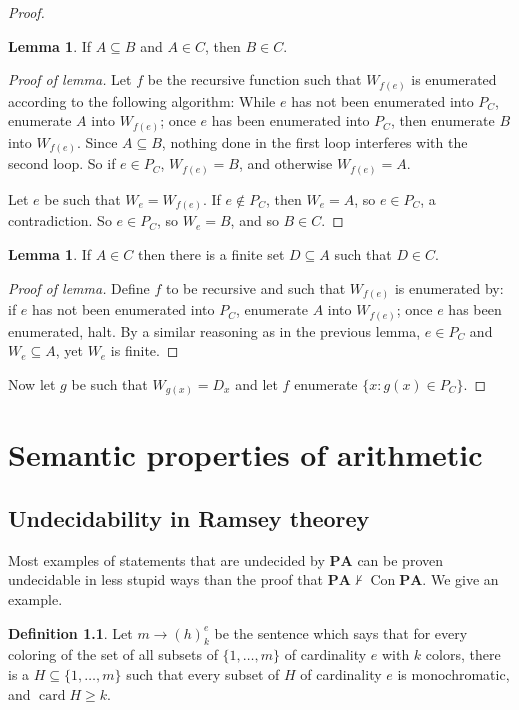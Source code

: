 \documentclass[12pt]{report}
\newcommand{\card}{\operatorname{card}}
\newcommand{\PA}{\mathbf{PA}}
\newcommand{\proves}{\vdash}
\DeclareMathOperator{\Con}{Con}
\theoremstyle{definition}
\newtheorem{lemma}[theorem]{Lemma}
\newtheorem{definition}[theorem]{Definition}
\begin{document}
\begin{proof}
\begin{lemma}
If $A \subseteq B$ and $A \in C$, then $B \in C$.
\end{lemma}
\begin{proof}[Proof of lemma]
Let $f$ be the recursive function such that $W_{f(e)}$ is enumerated according to the following algorithm: While $e$ has not been enumerated into $P_C$, enumerate $A$ into $W_{f(e)}$; once $e$ has been enumerated into $P_C$, then enumerate $B$ into $W_{f(e)}$.
Since $A \subseteq B$, nothing done in the first loop interferes with the second loop.
So if $e \in P_C$, $W_{f(e)} = B$, and otherwise $W_{f(e)} = A$.

Let $e$ be such that $W_e = W_{f(e)}$. If $e \notin P_C$, then $W_e = A$, so $e \in P_C$, a contradiction. So $e \in P_C$, so $W_e = B$, and so $B \in C$.
\end{proof}
\begin{lemma}
If $A \in C$ then there is a finite set $D \subseteq A$ such that $D \in C$.
\end{lemma}
\begin{proof}[Proof of lemma]
Define $f$ to be recursive and such that $W_{f(e)}$ is enumerated by: if $e$ has not been enumerated into $P_C$, enumerate $A$ into $W_{f(e)}$; once $e$ has been enumerated, halt.
By a similar reasoning as in the previous lemma, $e \in P_C$ and $W_e \subseteq A$, yet $W_e$ is finite.
\end{proof}

Now let $g$ be such that $W_{g(x)} = D_x$ and let $f$ enumerate $\{x: g(x) \in P_C\}$.
\end{proof}



\chapter{Semantic properties of arithmetic}
\section{Undecidability in Ramsey theorey}
Most examples of statements that are undecided by $\PA$ can be proven undecidable in less stupid ways than the proof that $\PA \not\proves \Con \PA$. We give an example.
\begin{definition}
Let $m \to (h)_k^e$ be the sentence which says that for every coloring of the set of all subsets of $\{1, \dots, m\}$ of cardinality $e$ with $k$ colors, there is a $H \subseteq \{1, \dots, m\}$ such that every subset of $H$ of cardinality $e$ is monochromatic, and $\card H \geq k$.
\end{definition}
\end{document}
